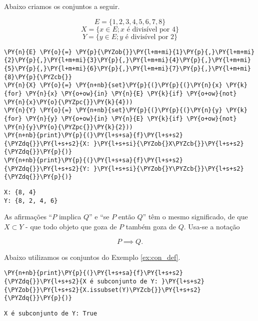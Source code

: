 \documentclass{book}
\begin{document}
        \begin{exemplo}
        \label{ex:con_def}
            Abaixo criamos os conjuntos a seguir.
        
            $$E = \{1,2,3,4,5,6,7,8\}$$
            $$X = \{x \in E; x \text{ é divisível por }4\}$$
            $$Y = \{y \in E; y \text{ é divisível por }2\}$$


\begin{Verbatim}[commandchars=\\\{\},frame=single,fontsize=\small, xleftmargin=0.5em]
\PY{n}{E} \PY{o}{=} \PY{p}{\PYZob{}}\PY{l+m+mi}{1}\PY{p}{,}\PY{l+m+mi}{2}\PY{p}{,}\PY{l+m+mi}{3}\PY{p}{,}\PY{l+m+mi}{4}\PY{p}{,}\PY{l+m+mi}{5}\PY{p}{,}\PY{l+m+mi}{6}\PY{p}{,}\PY{l+m+mi}{7}\PY{p}{,}\PY{l+m+mi}{8}\PY{p}{\PYZcb{}}
\PY{n}{X} \PY{o}{=} \PY{n+nb}{set}\PY{p}{(}\PY{p}{(}\PY{n}{x} \PY{k}{for} \PY{n}{x} \PY{o+ow}{in} \PY{n}{E} \PY{k}{if} \PY{o+ow}{not} \PY{n}{x}\PY{o}{\PYZpc{}}\PY{k}{4}))
\PY{n}{Y} \PY{o}{=} \PY{n+nb}{set}\PY{p}{(}\PY{p}{(}\PY{n}{y} \PY{k}{for} \PY{n}{y} \PY{o+ow}{in} \PY{n}{E} \PY{k}{if} \PY{o+ow}{not} \PY{n}{y}\PY{o}{\PYZpc{}}\PY{k}{2}))
\PY{n+nb}{print}\PY{p}{(}\PY{l+s+sa}{f}\PY{l+s+s2}{\PYZdq{}}\PY{l+s+s2}{X: }\PY{l+s+si}{\PYZob{}X\PYZcb{}}\PY{l+s+s2}{\PYZdq{}}\PY{p}{)}
\PY{n+nb}{print}\PY{p}{(}\PY{l+s+sa}{f}\PY{l+s+s2}{\PYZdq{}}\PY{l+s+s2}{Y: }\PY{l+s+si}{\PYZob{}Y\PYZcb{}}\PY{l+s+s2}{\PYZdq{}}\PY{p}{)}
\end{Verbatim}

\begin{Verbatim}[commandchars=\\\{\},frame=leftline,fontsize=\small, xleftmargin=0.5em]
X: {8, 4}
Y: {8, 2, 4, 6}
\end{Verbatim}

        \end{exemplo}

        As afirmações ``$P$ implica $Q$'' e ``se $P$ então $Q$'' têm o mesmo significado, de que $X \subset Y$ - que todo objeto que goza de $P$ também goza de $Q$. Usa-se a notação

        $$P \implies Q \text{.}$$

        \begin{exemplo}
            Abaixo utilizamos os conjuntos do Exemplo \ref{ex:con_def}.


\begin{Verbatim}[commandchars=\\\{\},frame=single,fontsize=\small, xleftmargin=0.5em]
\PY{n+nb}{print}\PY{p}{(}\PY{l+s+sa}{f}\PY{l+s+s2}{\PYZdq{}}\PY{l+s+s2}{X é subconjunto de Y: }\PY{l+s+s2}{\PYZob{}}\PY{l+s+s2}{X.issubset(Y)\PYZcb{}}\PY{l+s+s2}{\PYZdq{}}\PY{p}{)}
\end{Verbatim}

\begin{Verbatim}[commandchars=\\\{\},frame=leftline,fontsize=\small, xleftmargin=0.5em]
X é subconjunto de Y: True
\end{Verbatim}

        \end{exemplo}
\end{document}
